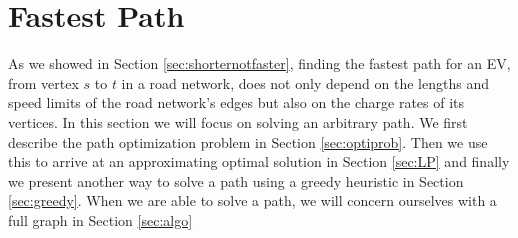 \section{Fastest Path}
\label{sec:fastestpath}
As we showed in Section \ref{sec:shorternotfaster}, finding the fastest path for an EV, from vertex $s$ to $t$ in a road network, does not only depend on the lengths and speed limits of the road network's edges but also on the charge rates of its vertices. In this section we will focus on solving an arbitrary path. We first describe the path optimization problem in Section \ref{sec:optiprob}. Then we use this to arrive at an approximating optimal solution in Section \ref{sec:LP} and finally we present another way to solve a path using a greedy heuristic in Section \ref{sec:greedy}. When we are able to solve a path, we will concern ourselves with a full graph in Section \ref{sec:algo}